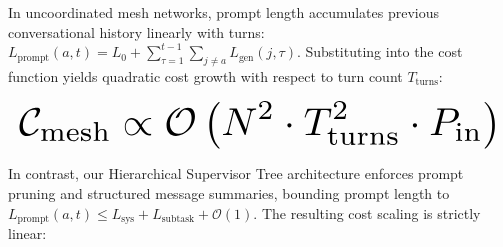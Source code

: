 \documentclass{article}
\begin{document}
In uncoordinated mesh networks, prompt length accumulates previous conversational history linearly with turns: $L_{\text{prompt}}(a, t) = L_0 + \sum_{\tau=1}^{t-1} \sum_{j \ne a} L_{\text{gen}}(j, \tau)$. Substituting into the cost function yields quadratic cost growth with respect to turn count $T_{\text{turns}}$:


























\begin{equation}
\resizebox{\columnwidth}{!}{$\displaystyle
\begin{aligned}
\mathcal{C}_{\text{mesh}} \propto \mathcal{O}\left(N^2 \cdot T_{\text{turns}}^2 \cdot P_{\text{in}}\right)
\end{aligned}
$}
\end{equation}


























In contrast, our Hierarchical Supervisor Tree architecture enforces prompt pruning and structured message summaries, bounding prompt length to $L_{\text{prompt}}(a, t) \le L_{\text{sys}} + L_{\text{subtask}} + \mathcal{O}(1)$. The resulting cost scaling is strictly linear:
\end{document}

